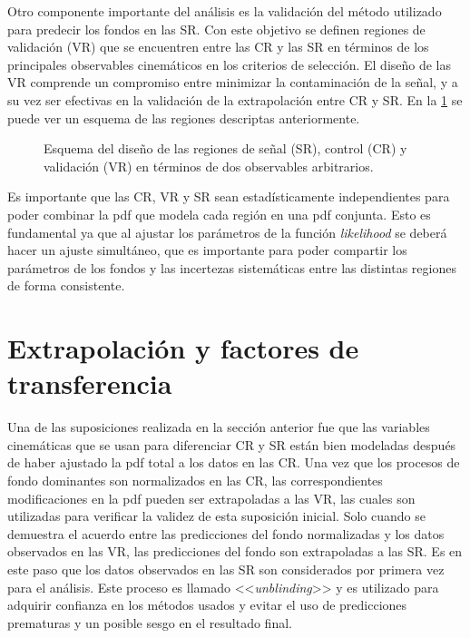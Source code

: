 Otro componente importante del análisis es la validación del método utilizado
para predecir los fondos en las SR. Con este objetivo se definen regiones de
validación (VR) que se encuentren entre las CR y las SR en términos de los
principales observables cinemáticos en los criterios de selección. El diseño de
las VR comprende un compromiso entre minimizar la contaminación de la señal, y a su
vez ser efectivas en la validación de la extrapolación entre CR y SR. En la
\cref{fig:regions_sketch} se puede ver un esquema de las regiones descriptas
anteriormente.

\begin{figure}[!htbp]
  \centering 
  \caption{Esquema del diseño de las regiones de señal (SR), control (CR) y
    validación (VR) en términos de dos observables arbitrarios.}
  \label{fig:regions_sketch}
\end{figure}

Es importante que las CR, VR y SR sean estadísticamente independientes para
poder combinar la pdf que modela cada región en una pdf conjunta. Esto es
fundamental ya que al ajustar los parámetros de la función \emph{likelihood} se deberá
hacer un ajuste simultáneo, que es importante para poder compartir los
parámetros de los fondos y las incertezas sistemáticas entre las distintas
regiones de forma consistente.


\section{Extrapolación y factores de transferencia}

Una de las suposiciones realizada en la sección anterior fue que las variables
cinemáticas que se usan para diferenciar CR y SR están bien modeladas después de
haber ajustado la pdf total a los datos en las CR. Una vez que los procesos de
fondo dominantes son normalizados en las CR, las correspondientes modificaciones
en la pdf pueden ser extrapoladas a las VR, las cuales son utilizadas para
verificar la validez de esta suposición inicial. Solo cuando se demuestra el
acuerdo entre las predicciones del fondo normalizadas y los datos observados en
las VR, las predicciones del fondo son extrapoladas a las SR.
Es en este paso que los datos observados en las SR son considerados por primera
vez para el análisis. Este proceso es llamado <<\emph{unblinding}>> y es
utilizado para adquirir confianza en los métodos usados y
evitar el uso de predicciones prematuras y un posible sesgo en el
resultado final.

